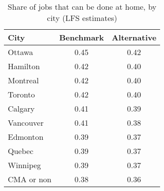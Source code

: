 \begin{table}[ht]
\centering
\caption{Share of jobs that can be done at home, by city (LFS estimates)} 
\label{tab:cities_lfs}
\begin{tabular}{lcc}
  \hline
City & Benchmark & Alternative \\ 
  \hline
Ottawa & 0.45 & 0.42 \\ 
  Hamilton & 0.42 & 0.40 \\ 
  Montreal & 0.42 & 0.40 \\ 
  Toronto & 0.42 & 0.40 \\ 
  Calgary & 0.41 & 0.39 \\ 
  Vancouver & 0.41 & 0.38 \\ 
  Edmonton & 0.39 & 0.37 \\ 
  Quebec & 0.39 & 0.37 \\ 
  Winnipeg & 0.39 & 0.37 \\ 
  CMA or non & 0.38 & 0.36 \\ 
   \hline
\end{tabular}
\end{table}
